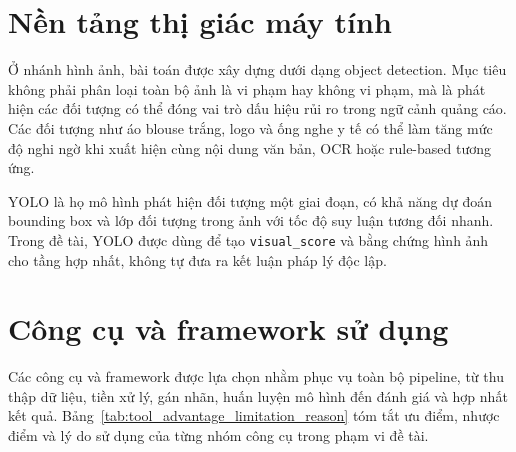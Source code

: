 \section{Nền tảng thị giác máy tính}
Ở nhánh hình ảnh, bài toán được xây dựng dưới dạng object detection. Mục tiêu không phải phân loại toàn bộ ảnh là vi phạm hay không vi phạm, mà là phát hiện các đối tượng có thể đóng vai trò dấu hiệu rủi ro trong ngữ cảnh quảng cáo. Các đối tượng như áo blouse trắng, logo và ống nghe y tế có thể làm tăng mức độ nghi ngờ khi xuất hiện cùng nội dung văn bản, OCR hoặc rule-based tương ứng.

YOLO là họ mô hình phát hiện đối tượng một giai đoạn, có khả năng dự đoán bounding box và lớp đối tượng trong ảnh với tốc độ suy luận tương đối nhanh. Trong đề tài, YOLO được dùng để tạo \texttt{visual\_score} và bằng chứng hình ảnh cho tầng hợp nhất, không tự đưa ra kết luận pháp lý độc lập.

\section{Công cụ và framework sử dụng}
Các công cụ và framework được lựa chọn nhằm phục vụ toàn bộ pipeline, từ thu thập dữ liệu, tiền xử lý, gán nhãn, huấn luyện mô hình đến đánh giá và hợp nhất kết quả. Bảng~\ref{tab:tool_advantage_limitation_reason} tóm tắt ưu điểm, nhược điểm và lý do sử dụng của từng nhóm công cụ trong phạm vi đề tài.

